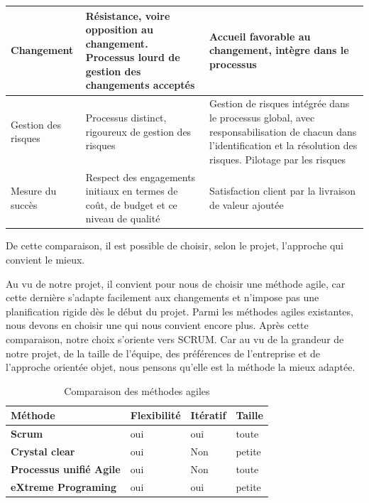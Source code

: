 \begin{table}[H]
\begin{tabular}{|l|p{5cm}|p{6cm}|}
		Changement          & Résistance, voire opposition au changement. Processus lourd de gestion des changements acceptés          & Accueil favorable au changement, intègre dans le processus                                                                                                           \\ \hline
		Gestion des risques & Processus distinct, rigoureux de gestion des risques                                                    & Gestion de risques intégrée dans le processus global, avec responsabilisation de chacun dans l’identification et la résolution des risques. Pilotage par les risques \\ \hline
		Mesure du succès    & Respect des engagements initiaux en termes de coût, de budget et ce niveau de qualité                 & Satisfaction client par la livraison de valeur ajoutée                                                                                                               \\ \hline
	\end{tabular}
\end{table}

De cette comparaison, il est possible de choisir, selon le projet, l’approche qui convient le
mieux.

Au vu de notre projet, il convient pour nous de choisir une méthode agile, car cette dernière
s’adapte facilement aux changements et n’impose pas une planification rigide dès le début du
projet. Parmi les méthodes agiles existantes, nous devons en choisir une qui nous convient
encore plus. Après cette comparaison, notre choix s’oriente vers SCRUM.
Car au vu de la grandeur de notre projet, de la taille de l’équipe, des préférences de l’entreprise et de l’approche orientée objet, nous pensons qu’elle est la méthode la mieux adaptée.

\begin{table}[H]
	\centering
	\caption{Comparaison des méthodes agiles}
	\label{tab:my-table}
	\begin{tabular}{|l|l|l|l|}
		\hline
		\textbf{Méthode}                & \textbf{Flexibilité} & \textbf{Itératif} & \textbf{Taille} \\ \hline
		\textbf{Scrum}                  & oui                  & oui               & toute           \\ \hline
		\textbf{Crystal clear}          & oui                  & Non               & petite          \\ \hline
		\textbf{Processus unifié Agile} & oui                  & Non               & toute           \\ \hline
		\textbf{eXtreme Programing}     & oui                  & oui               & petite          \\ \hline
	\end{tabular}
\end{table}


